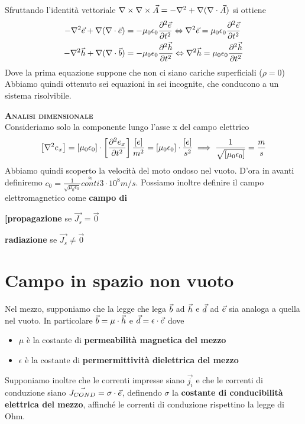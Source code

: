 Sfruttando l'identità vettoriale $\rot\rot\vec{A} = -\nabla^2 + \nabla(\diverg\vec{A})$ si ottiene
\begin{equation}\begin{split}
  -\nabla^2\e + \nabla(\diverg\e) &= - \mu_0\epsilon_0 \deriv[2]{\e}{t} \Leftrightarrow \nabla^2\e = \mu_0\epsilon_0\deriv[2]{\e}{t}\\
  -\nabla^2\h + \nabla(\diverg\b) &= - \mu_0\epsilon_0 \deriv[2]{\h}{t} \Leftrightarrow \nabla^2\h = \mu_0\epsilon_0\deriv[2]{\h}{t}\\
\end{split}\end{equation}
Dove la prima equazione suppone che non ci siano cariche superficiali ($\rho=0$)
Abbiamo quindi ottenuto sei equazioni in sei incognite, che conducono a un sistema risolvibile.

\textbf{\textsc{Analisi dimensionale}}\\
Consideriamo solo la componente lungo l'asse x del campo elettrico
\begin{equation}
  \left[\nabla^2 e_x\right] = \left[\mu_0\epsilon_0\right]  \cdot \left[\deriv[2]{e_x}{t}\right] \\
  \frac{[e]}{m^2} = [\mu_0\epsilon_0] \cdot \frac{[e]}{s^2} \implies \frac{1}{\sqrt{[\mu_0\epsilon_0]}} = \frac{m}{s}
\end{equation}
Abbiamo quindi scoperto la velocità del moto ondoso nel vuoto. D'ora in avanti definiremo
$c_0 = \frac{1}{\sqrt{\mu_0\epsilon_0}}\stackrel{\approx}{conti} 3 \cdot 10^8 m/s$.
Possiamo inoltre definire il campo elettromagnetico come \textbf{campo di}
\begin{description}
  \item \textbf{[propagazione} se $\vec{J_s}=\vec{0}$
  \item \textbf{radiazione} se $\vec{J_s}\neq\vec{0}$
\end{description}

\section{Campo in spazio non vuoto}
Nel mezzo, supponiamo che la legge che lega $\b$ ad $\h$ e $\d$ ad $\e$ sia analoga a quella nel vuoto.
In particolare $\b=\mu\cdot\h$ e $\d=\epsilon\cdot\e$ dove
\begin{itemize}
  \item $\mu$ è la costante di \textbf{permeabilità  magnetica del mezzo}
  \item $\epsilon$ è la costante di \textbf{permermittività  dielettrica del mezzo}
\end{itemize}
Supponiamo inoltre che le correnti impresse siano $\vec{j_i}$ e che le correnti di conduzione siano
$\vec{J_{COND}} = \sigma \cdot \e$, definendo $\sigma$ la \textbf{costante di conducibilità elettrica
del mezzo}, affinché le correnti di conduzione rispettino la legge di Ohm.

